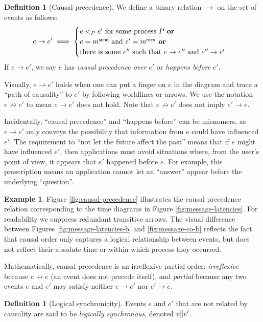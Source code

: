 \documentclass[]             %
{NASA}                       %
\theoremstyle{definition}
\newtheorem{example}[theorem]{Example}
\newtheorem{definition}[theorem]{Definition}
\begin{document}
\begin{definition}[Causal precedence]
  \label{def:causalprecedence}
  We define a binary relation $\to$ on the set of events as follows:
  \[e \to e' \iff
  \begin{cases}
    e <_{P} e' \textrm{ for some process $P$}
    \textbf{ or} \\
    e = m_{}^{\mathsf{send}} \textrm{ and } e' =m_{}^{\mathsf{recv}}
    \textbf{ or} \\
    \textrm{there is some } e'' \textrm{ such that } e \to e'' \textrm{ and } e'' \to e'
  \end{cases}
  \]
  If $e \to e'$, we say $e$ has \emph{causal precedence over} $e'$ or
  \emph{happens before} $e'$.
\end{definition}
Visually, $e \to e'$ holds when one can put a finger on $e$ in the
diagram and trace a ``path of causality'' to $e'$ by following
worldlines or arrows. We use the notation $e \not \to e'$ to mean
$e \to e'$ does not hold. Note that $e \not \to e'$ does not imply
$e' \to e$.

Incidentally, ``causal precedence'' and ``happens before'' can be
misnomers, as $e \to e'$ only conveys the possibility that information
from $e$ could have influenced $e'$. The requirement to ``not let the
future affect the past'' means that if $e$ might have influenced $e'$,
then applications must avoid situations where, from the user's point
of view, it appears that $e'$ happened before $e$. For example, this
proscription means an application cannot let an ``answer'' appear
before the underlying ``question''.

\begin{example}
  Figure \ref{fig:causal-precedence} illustrates the causal precedence
  relation corresponding to the time diagrams in Figure
  \ref{fig:message-latencies}. For readability we suppress redundant
  transitive arrows. The visual difference between Figures
  \ref{fig:message-latencies-b} and \ref{fig:message-co-b} reflects
  the fact that causal order only captures a logical relationship
  between events, but does not reflect their absolute time or within
  which process they occurred.
\end{example}

Mathematically, causal precedence is an irreflexive partial order:
\emph{irreflexive} because $e \not \to e$ (an event does not precede
itself), and \emph{partial} because any two events $e$ and $e'$ may
satisfy neither $e \to e'$ nor $e' \to e$.

\begin{definition}[Logical synchronicity]
  \label{def:logically-synchronous}
  Events $e$ and $e'$ that are not related by causality are said to be
  \emph{logically synchronous}, denoted $e || e'$.
\end{definition}
\end{document}
